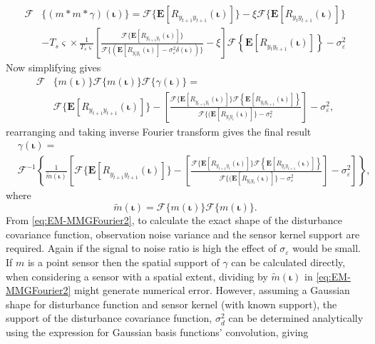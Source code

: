 \documentclass[]{article}
\begin{document}
\begin{align}
	\mathcal{F}&\{(m\ast m \ast \gamma)(\boldsymbol\iota)\} = \mathcal{F}\{\mathbf{E}[R_{y_{t+1}y_{t+1}}(\boldsymbol{\iota})]\}-\xi \mathcal{F}\{\mathbf{E}[R_{y_ty_{t+1}}(\boldsymbol{\iota})]\}\nonumber \\ 
	&- T_s\varsigma \times \frac{1}{T_s\varsigma }\left[\frac{\mathcal{F}\{\mathbf{E}[R_{y_{t+1}y_t}(\boldsymbol{\iota})]\}}{\mathcal{F}\{(\mathbf{E}\left[R_{y_ty_t}(\boldsymbol\iota)\right] - \sigma_{\varepsilon}^2 \delta(\boldsymbol\iota))\}}-\xi\right]\mathcal{F}\left\{\mathbf{E}\left[R_{y_ty_{t+1}}(\boldsymbol\iota)\right] \right\} -\sigma_{\varepsilon}^2\label{eq:EM=mmgamma}
\end{align}
Now simplifying gives
\begin{align}\label{eq:EM-MMGFourier1}
	\mathcal{F}&\{m(\boldsymbol\iota)\}\mathcal{F}\{m(\boldsymbol\iota)\}\mathcal{F}\{\gamma(\boldsymbol\iota)\} = \nonumber \\
&\mathcal{F}\{\mathbf{E}[R_{y_{t+1}y_{t+1}}(\boldsymbol{\iota})]\}- \left[\frac{\mathcal{F}\{\mathbf{E}[R_{y_{t+1}y_t}(\boldsymbol{\iota})]\}\mathcal{F}\left\{\mathbf{E}\left[R_{y_ty_{t+1}}(\boldsymbol\iota)\right] \right\}}{\mathcal{F}\{(\mathbf{E}\left[R_{y_ty_t}(\boldsymbol\iota)\right]\} - \sigma_{\varepsilon}^2}\right]-\sigma_{\varepsilon}^2 ,
\end{align}
rearranging and taking inverse Fourier transform gives the final result
\begin{align}\label{eq:EM-MMGFourier2}
	&\gamma(\boldsymbol\iota) = \nonumber \\
&\mathcal{F}^{-1}\left\lbrace \frac{1}{\tilde{m}(\boldsymbol\iota)}\left[\mathcal{F}\{\mathbf{E}[R_{y_{t+1}y_{t+1}}(\boldsymbol{\iota})]\}- \left[\frac{\mathcal{F}\{\mathbf{E}[R_{y_{t+1}y_t}(\boldsymbol{\iota})]\}\mathcal{F}\left\{\mathbf{E}\left[R_{y_ty_{t+1}}(\boldsymbol\iota)\right] \right\}}{\mathcal{F}\{(\mathbf{E}\left[R_{y_ty_t}(\boldsymbol\iota)\right]\} - \sigma_{\varepsilon}^2}\right]-\sigma_{\varepsilon}^2\right]\right\rbrace  ,
\end{align}
where
\begin{equation}
 \tilde{m}(\boldsymbol\iota)=\mathcal{F}\{m(\boldsymbol\iota)\}\mathcal{F}\{m(\boldsymbol\iota)\}.
\end{equation}
From \eqref{eq:EM-MMGFourier2}, to calculate the exact shape of the disturbance covariance function, observation noise variance and the sensor kernel support are required. Again if the signal to noise ratio is high the effect of $\sigma_{\varepsilon}$ would be small. If $m$ is a point sensor then the spatial support of $\gamma$ can be calculated directly, when considering a sensor with a spatial extent, dividing by $\tilde{m}(\boldsymbol\iota)$ in \eqref{eq:EM-MMGFourier2} might generate numerical error.  However, assuming a Gaussian shape for disturbance function and sensor kernel (with known support), the support of the disturbance covariance function, $\sigma^2_d$ can be determined analytically using the expression for Gaussian basis functions' convolution, giving 
\end{document}
